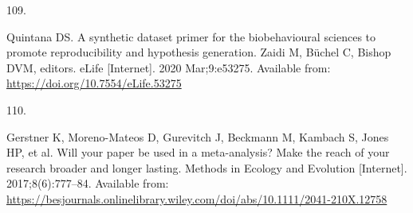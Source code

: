 \documentclass[10pt,a4paper]{article}
\newlength{\cslhangindent}
\newlength{\csllabelwidth}
\newlength{\cslentryspacingunit} %
\newenvironment{CSLReferences}[2] %
 {%
  \setlength{\parindent}{0pt}
  \ifodd #1
  \let\oldpar\par
  \def\par{\hangindent=\cslhangindent\oldpar}
  \fi
  \setlength{\parskip}{#2\cslentryspacingunit}
 }%
 {}
\newcommand{\CSLLeftMargin}[1]{\parbox[t]{\csllabelwidth}{#1}}
\newcommand{\CSLRightInline}[1]{\parbox[t]{\linewidth - \csllabelwidth}{#1}\break}
\begin{document}
\begin{CSLReferences}{0}{0}
\leavevmode{}%
\CSLLeftMargin{109. }
\CSLRightInline{Quintana DS. A synthetic dataset primer for the biobehavioural sciences to promote reproducibility and hypothesis generation. Zaidi M, Büchel C, Bishop DVM, editors. eLife {[}Internet{]}. 2020 Mar;9:e53275. Available from: \url{https://doi.org/10.7554/eLife.53275}}

\leavevmode{}%
\CSLLeftMargin{110. }
\CSLRightInline{Gerstner K, Moreno-Mateos D, Gurevitch J, Beckmann M, Kambach S, Jones HP, et al. Will your paper be used in a meta-analysis? Make the reach of your research broader and longer lasting. Methods in Ecology and Evolution {[}Internet{]}. 2017;8(6):777--84. Available from: \url{https://besjournals.onlinelibrary.wiley.com/doi/abs/10.1111/2041-210X.12758}}

\end{CSLReferences}
\end{document}
